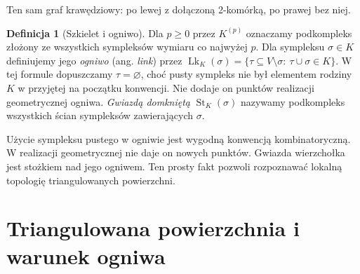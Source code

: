 \documentclass[11pt,a4paper]{report}
\numberwithin{equation}{section}
\theoremstyle{plain}
\theoremstyle{definition}
\newtheorem{definicja}[twierdzenie]{Definicja}
\theoremstyle{remark}
\begin{document}
\begin{samepage}
\begin{center}
\begin{minipage}{.96\linewidth}\centering
{}\par\smallskip

{\footnotesize Ten sam graf krawędziowy: po lewej z dołączoną
2-komórką, po prawej bez niej.}
\end{minipage}
\end{center}
\end{samepage}

\begin{definicja}[Szkielet i ogniwo]
Dla $p\ge0$ przez $K^{(p)}$ oznaczamy podkompleks
złożony ze wszystkich sympleksów wymiaru co najwyżej $p$.
Dla sympleksu $\sigma\in K$ definiujemy jego
\emph{ogniwo} (ang. \emph{link}) przez
$\operatorname{Lk}_K(\sigma)
=\{\tau\subseteq V\setminus\sigma:
\ \tau\cup\sigma\in K\}$.
W tej formule dopuszczamy $\tau=\varnothing$, choć
pusty sympleks nie był elementem rodziny $K$ w przyjętej
na początku konwencji. Nie dodaje on punktów
realizacji geometrycznej ogniwa. \emph{Gwiazdą domkniętą}
$\operatorname{St}_K(\sigma)$ nazywamy podkompleks
wszystkich ścian sympleksów zawierających $\sigma$.
\end{definicja}

Użycie sympleksu pustego w ogniwie jest wygodną konwencją
kombinatoryczną. W realizacji geometrycznej nie daje on
nowych punktów. Gwiazda wierzchołka jest stożkiem nad
jego ogniwem. Ten prosty fakt pozwoli rozpoznawać lokalną
topologię triangulowanych powierzchni.

\section{Triangulowana powierzchnia i warunek ogniwa}
\label{sec:tg-link-manifold}
\end{document}

